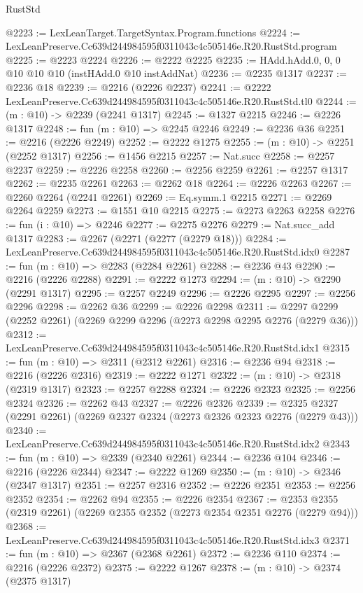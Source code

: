 \begin{lexlean}{RustStd}
\begin{coremodule}
@2223 := LexLeanTarget.TargetSyntax.Program.functions
@2224 := LexLeanPreserve.Cc639d244984595f0311043c4c505146e.R20.RustStd.program
@2225 := @2223 @2224
@2226 := @2222 @2225
@2235 := HAdd.hAdd.{0, 0, 0} @10 @10 @10 (instHAdd.{0} @10 instAddNat)
@2236 := @2235 @1317
@2237 := @2236 @18
@2239 := @2216 (@2226 @2237)
@2241 := @2222 LexLeanPreserve.Cc639d244984595f0311043c4c505146e.R20.RustStd.tl0
@2244 := (m : @10) -> @2239 (@2241 @1317)
@2245 := @1327 @2215
@2246 := @2226 @1317
@2248 := fun (m : @10) => @2245 @2246
@2249 := @2236 @36
@2251 := @2216 (@2226 @2249)
@2252 := @2222 @1275
@2255 := (m : @10) -> @2251 (@2252 @1317)
@2256 := @1456 @2215
@2257 := Nat.succ
@2258 := @2257 @2237
@2259 := @2226 @2258
@2260 := @2256 @2259
@2261 := @2257 @1317
@2262 := @2235 @2261
@2263 := @2262 @18
@2264 := @2226 @2263
@2267 := @2260 @2264 (@2241 @2261)
@2269 := Eq.symm.{1} @2215
@2271 := @2269 @2264 @2259
@2273 := @1551 @10 @2215
@2275 := @2273 @2263 @2258
@2276 := fun (i : @10) => @2246
@2277 := @2275 @2276
@2279 := Nat.succ_add @1317
@2283 := @2267 (@2271 (@2277 (@2279 @18)))
@2284 := LexLeanPreserve.Cc639d244984595f0311043c4c505146e.R20.RustStd.idx0
@2287 := fun (m : @10) => @2283 (@2284 @2261)
@2288 := @2236 @43
@2290 := @2216 (@2226 @2288)
@2291 := @2222 @1273
@2294 := (m : @10) -> @2290 (@2291 @1317)
@2295 := @2257 @2249
@2296 := @2226 @2295
@2297 := @2256 @2296
@2298 := @2262 @36
@2299 := @2226 @2298
@2311 := @2297 @2299 (@2252 @2261) (@2269 @2299 @2296 (@2273 @2298 @2295 @2276 (@2279 @36)))
@2312 := LexLeanPreserve.Cc639d244984595f0311043c4c505146e.R20.RustStd.idx1
@2315 := fun (m : @10) => @2311 (@2312 @2261)
@2316 := @2236 @94
@2318 := @2216 (@2226 @2316)
@2319 := @2222 @1271
@2322 := (m : @10) -> @2318 (@2319 @1317)
@2323 := @2257 @2288
@2324 := @2226 @2323
@2325 := @2256 @2324
@2326 := @2262 @43
@2327 := @2226 @2326
@2339 := @2325 @2327 (@2291 @2261) (@2269 @2327 @2324 (@2273 @2326 @2323 @2276 (@2279 @43)))
@2340 := LexLeanPreserve.Cc639d244984595f0311043c4c505146e.R20.RustStd.idx2
@2343 := fun (m : @10) => @2339 (@2340 @2261)
@2344 := @2236 @104
@2346 := @2216 (@2226 @2344)
@2347 := @2222 @1269
@2350 := (m : @10) -> @2346 (@2347 @1317)
@2351 := @2257 @2316
@2352 := @2226 @2351
@2353 := @2256 @2352
@2354 := @2262 @94
@2355 := @2226 @2354
@2367 := @2353 @2355 (@2319 @2261) (@2269 @2355 @2352 (@2273 @2354 @2351 @2276 (@2279 @94)))
@2368 := LexLeanPreserve.Cc639d244984595f0311043c4c505146e.R20.RustStd.idx3
@2371 := fun (m : @10) => @2367 (@2368 @2261)
@2372 := @2236 @110
@2374 := @2216 (@2226 @2372)
@2375 := @2222 @1267
@2378 := (m : @10) -> @2374 (@2375 @1317)

\end{coremodule}
\end{lexlean}
